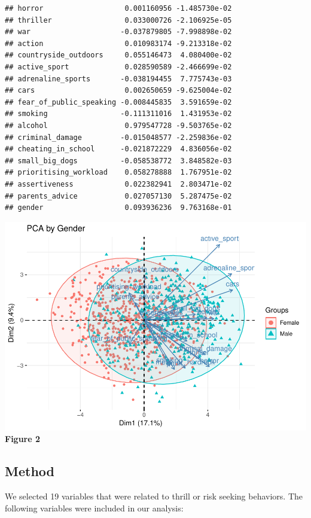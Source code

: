 \documentclass[]{article}
\begin{document}
\begin{verbatim}
## horror                   0.001160956 -1.485730e-02
## thriller                 0.033000726 -2.106925e-05
## war                     -0.037879805 -7.998898e-02
## action                   0.010983174 -9.213318e-02
## countryside_outdoors     0.055146473  4.080400e-02
## active_sport             0.028590589 -2.466699e-02
## adrenaline_sports       -0.038194455  7.775743e-03
## cars                     0.002650659 -9.625004e-02
## fear_of_public_speaking -0.008445835  3.591659e-02
## smoking                 -0.111311016  1.431953e-02
## alcohol                  0.979547728 -9.503765e-02
## criminal_damage         -0.015048577 -2.259836e-02
## cheating_in_school      -0.021872229  4.836056e-02
## small_big_dogs          -0.058538772  3.848582e-03
## prioritising_workload    0.058278888  1.767951e-02
## assertiveness            0.022382941  2.803471e-02
## parents_advice           0.027057130  5.287475e-02
## gender                   0.093936236  9.763168e-01
\end{verbatim}

\includegraphics{final_report_files/figure-latex/unnamed-chunk-2-1.pdf}
\textbf{Figure 2}

\subsection{Method}\label{method}

We selected 19 variables that were related to thrill or risk seeking
behaviors. The following variables were included in our analysis:
\end{document}
